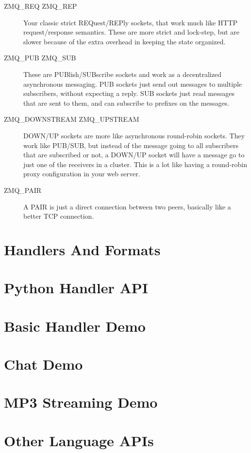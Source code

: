\begin{description}
\item [ZMQ\_REQ ZMQ\_REP]  Your classic strict REQuest/REPly sockets, that work much like 
    HTTP request/response semantics.  These are more strict and lock-step, but are slower
    because of the extra overhead in keeping the state organized.
\item [ZMQ\_PUB ZMQ\_SUB]  These are PUBlish/SUBscribe sockets and work as a decentralized 
    asynchronous messaging.  PUB sockets just send out messages to multiple subscribers, without
    expecting a reply.  SUB sockets just read messages that are sent to them, and can subscribe
    to prefixes on the messages.
\item [ZMQ\_DOWNSTREAM ZMQ\_UPSTREAM] DOWN/UP sockets are more like asynchronous round-robin 
    sockets.  They work like PUB/SUB, but instead of the message going to all subscribers that
    are subscribed or not, a DOWN/UP socket will have a message go to just one of the receivers
    in a cluster.  This is a lot like having a round-robin proxy configuration in your web server.
\item [ZMQ\_PAIR] A PAIR is just a direct connection between two peers, basically like a better
    TCP connection.
\end{description}



\section{Handlers And Formats}


\section{Python Handler API}


\section{Basic Handler Demo}


\section{Chat Demo}


\section{MP3 Streaming Demo}


\section{Other Language APIs}


